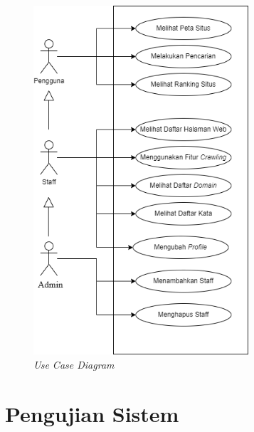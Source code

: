 \begin{figure}[H]
	\centering
	\includegraphics[keepaspectratio, width=8cm]{gambar/usecase.png}
	\caption{\textit{Use Case Diagram}}
	\label{gambar:usecase.png}
\end{figure}


\section {Pengujian Sistem}

